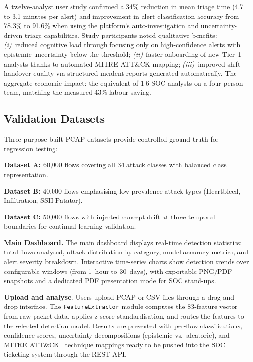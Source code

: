 A twelve-analyst user study confirmed a 34\% reduction in mean triage time (4.7 to 3.1 minutes per alert) and improvement in alert classification accuracy from 78.3\% to 91.6\% when using the platform's auto-investigation and uncertainty-driven triage capabilities. Study participants noted qualitative benefits: \emph{(i)}~reduced cognitive load through focusing only on high-confidence alerts with epistemic uncertainty below the threshold; \emph{(ii)}~faster onboarding of new Tier~1 analysts thanks to automated MITRE ATT\&CK mapping; \emph{(iii)}~improved shift-handover quality via structured incident reports generated automatically. The aggregate economic impact: the equivalent of 1.6 SOC analysts on a four-person team, matching the measured 43\% labour saving.

\subsection{Validation Datasets}

Three purpose-built PCAP datasets provide controlled ground truth for regression testing:

\noindent\textbf{Dataset A:} 60,000 flows covering all 34 attack classes with balanced class representation.

\noindent\textbf{Dataset B:} 40,000 flows emphasising low-prevalence attack types (Heartbleed, Infiltration, SSH-Patator).

\noindent\textbf{Dataset C:} 50,000 flows with injected concept drift at three temporal boundaries for continual learning validation.

\noindent\textbf{Main Dashboard.} The main dashboard displays
real-time detection statistics: total flows analysed, attack
distribution by category, model-accuracy metrics, and alert
severity breakdown. Interactive time-series charts show detection
trends over configurable windows (from 1~hour to 30~days), with
exportable PNG/PDF snapshots and a dedicated PDF presentation
mode for SOC stand-ups.

\noindent\textbf{Upload and analyse.} Users upload PCAP or CSV
files through a drag-and-drop interface. The
\texttt{FeatureExtractor} module computes the 83-feature vector
from raw packet data, applies z-score standardisation, and routes
the features to the selected detection model. Results are
presented with per-flow classifications, confidence scores,
uncertainty decompositions (epistemic vs.\ aleatoric), and MITRE
ATT\&CK~\cite{Hernandez2015} technique mappings ready to be pushed
into the SOC ticketing system through the REST API.

